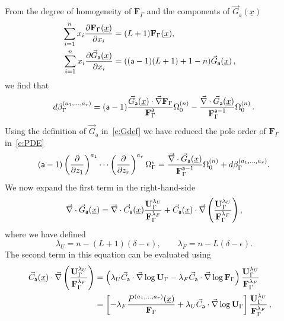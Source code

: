 \documentclass[a4paper,12pt]{article}
\numberwithin{equation}{section}
\numberwithin{figure}{section}
\begin{document}
From the degree of homogeneity of $\mathbf{F}_\Gamma$ and the
components of $\vec G_{\mathsf{a}}(\underline x)$ 
\begin{align}
  \sum_{i=1}^n x_i {\partial\mathbf{F}_\Gamma (\underline x)\over \partial x_i}&=
                                                                  (L+1) \mathbf{F}_\Gamma (\underline x),\cr
   \sum_{i=1}^n x_i {\partial\vec G_{\mathsf{a}}(\underline x)\over \partial x_i}&=
                                                                  ((\mathsf{a}-1)(L+1)+1-n) \vec G_{\mathsf{a}}(\underline x) \,,
\end{align}
we find that 
   \begin{equation}
     d\beta_\Gamma^{(a_1,\dots,a_r)}= (\mathsf{a}-1) {  \vec  G_{\mathsf{a}}
     (\underline x)
\cdot    \vec \nabla\textbf{F}_\Gamma\over
     \textbf{F}_\Gamma^{\mathsf{a}}}\Omega_0^{(n)}-{
\vec\nabla \cdot \vec G_{\mathsf{a}}
     (\underline x)
    \over
   \textbf{F}_\Gamma^{\mathsf{a}-1}}
  \Omega_0^{(n)} \,.
\end{equation}
Using the definition of $\vec  G_{\mathsf{a}}$ in~\eqref{e:Gdef} we
have reduced the pole order  of $ \textbf{F}_\Gamma$ in~\eqref{e:PDE} 
\begin{equation}\label{e:RedG1}
 (\mathsf{a}-1)\left(\partial\over \partial z_1\right)^{a_1}\cdots\left(\partial
  \over\partial z_r\right)^{a_r} \Omega_\Gamma^\epsilon={
\vec\nabla \cdot \vec G_{\mathsf{a}}
     (\underline x)
    \over
  \textbf{F}_\Gamma^{\mathsf{a}-1}}
  \Omega_0^{(n)}+d\beta_\Gamma^{(a_1,\dots,a_r)}.
\end{equation}
%
We now expand the first term in the right-hand-side
\begin{equation}
  \vec\nabla \cdot \vec G_{\mathsf{a}}(\underline x)=  \vec\nabla \cdot \vec C_{\mathsf{a}}(\underline x) {\textbf{U}_\Gamma^{\lambda_U}\over
  \textbf{F}_\Gamma^{\lambda_F}} 
+
  \vec C_{\mathsf{a}}(\underline x) \cdot\vec\nabla  \left(   {\textbf{U}_\Gamma^{\lambda_U}\over
  \textbf{F}_\Gamma^{\lambda_F}} \right),
\end{equation}
where we have defined
\begin{equation}\label{e:powerUFDef}
  \lambda_U=n-(L+1)(\delta-\epsilon), \qquad 
  \lambda_F=n-L(\delta-\epsilon).
  \end{equation}
%
The second term in this equation can be evaluated using 
\begin{align}
  \vec C_{\mathsf{a}}(\underline x)\cdot \vec\nabla \left(\mathbf{U}_\Gamma^{\lambda_U}\over
\mathbf{F}_\Gamma^{\lambda_F}\right)&=\left(\lambda_U \vec
C_{\mathsf{a}}\cdot \vec\nabla \log\mathbf{U}_\Gamma -{\lambda_F} \vec
C_{\mathsf{a}}\cdot \vec\nabla \log \mathbf{F}_\Gamma\right) {\mathbf{U}_\Gamma^{\lambda_U}\over
\mathbf{F}_\Gamma^{\lambda_F}} \cr
&=\left[-{\lambda_F}{
    P^{(a_1,\dots,a_r)}(\underline x)\over
  \mathbf{F}_\Gamma}   
+
 \lambda_U \vec
C_{\mathsf{a}}\cdot \vec\nabla \log\mathbf{U}_\Gamma \right] {\mathbf{U}_\Gamma^{\lambda_U}\over
	\mathbf{F}_\Gamma^{\lambda_F}}\,,
\end{align}
\end{document}
